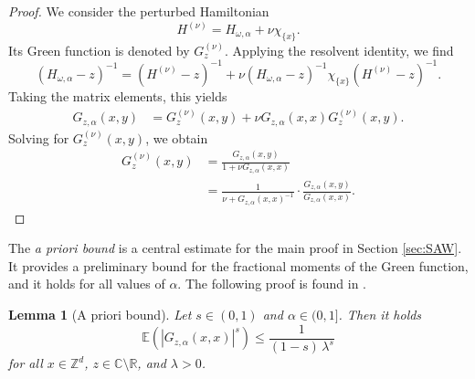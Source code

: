 \documentclass[11pt, a4paper, UKenglish, oneside]{book}
\theoremstyle{plain}
\newtheorem{lemma}[theorem]{Lemma}
\theoremstyle{remark}
\theoremstyle{definition}
\numberwithin{equation}{section}
\numberwithin{theorem}{section}
\begin{document}
\begin{proof}
    We consider the perturbed Hamiltonian
    \[
    H^{(\nu)} = H_{\omega,\alpha} + \nu \chi_{\{x\}}.
    \]
    Its Green function is denoted by $G^{(\nu)}_z$. Applying the resolvent identity, we find
    \[
    (H_{\omega,\alpha} - z)^{-1} = (H^{(\nu)} - z)^{-1} + \nu (H_{\omega,\alpha} - z)^{-1} \chi_{\{x\}} (H^{(\nu)} - z)^{-1}.
    \]
    Taking the matrix elements, this yields
    \begin{equation}
        \begin{split}
            G_{z,\alpha}(x,y) &= G^{(\nu)}_z(x,y)+ \nu G_{z,\alpha}(x,x)G^{(\nu)}_z(x,y).
        \end{split}
    \end{equation}
    Solving for $G^{(\nu)}_z(x,y)$, we obtain
    \begin{equation}
        \begin{split}
            G^{(\nu)}_z(x,y) &= \frac{G_{z,\alpha}(x,y)}{1 + \nu G_{z,\alpha}(x,x)} \\
            &= \frac{1}{\nu + G_{z,\alpha}(x,x)^{-1}} \cdot \frac{G_{z,\alpha}(x,y)}{G_{z,\alpha}(x,x)}. \label{eq:4.12}  
        \end{split}
    \end{equation}
\end{proof}

The \textit{a priori bound} is a central estimate for the main proof in Section \ref{sec:SAW}. It provides a preliminary bound for the fractional moments of the Green function, and it holds for all values of $\alpha$. The following proof is found in \cite{stolz2011}.
\begin{lemma}[A priori bound] \label{lemma:aprioribound}
Let $s \in (0,1)$ and $\alpha \in (0,1]$. Then it holds
\begin{equation}
\mathbb{E}(|G_{z,\alpha}(x, x)|^s) \le \frac{1}{(1-s) \,\lambda^{s}}
\end{equation}
for all $x \in \mathbb{Z}^d$, $z \in \mathbb{C} \setminus \mathbb{R}$, and $\lambda > 0$.
\end{lemma}
\end{document}
